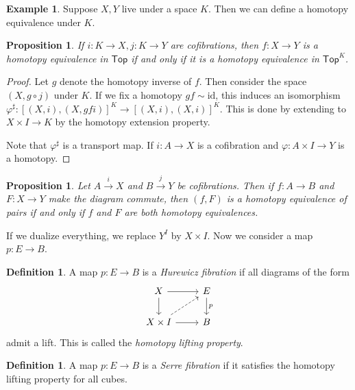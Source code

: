 \documentclass[leqno, openany]{memoir}
\newtheorem{prop}[thm]{Proposition}
\theoremstyle{definition}
\newtheorem{defn}[thm]{Definition}
\newtheorem{exm}[thm]{Example}
\theoremstyle{remark}
\theoremstyle{plain}
\theoremstyle{definition}
\theoremstyle{remark}
\newcommand{\mr}[1]{\mathrm{#1}}
\newcommand{\ms}[1]{\mathsf{#1}}
\begin{document}
\begin{exm}
    Suppose $X,Y$ live under a space $K$. Then we can define a homotopy equivalence under $K$.
\end{exm}

\begin{prop}
    If $i \colon K \to X,j \colon K \to Y$ are cofibrations, then $f \colon X \to Y$ is a homotopy equivalence in $\ms{Top}$ if and only if it is a homotopy equivalence in $\ms{Top}^K$.
\end{prop}

\begin{proof}
    Let $g$ denote the homotopy inverse of $f$. Then consider the space $(X, g \circ j)$ under $K$. If we fix a homotopy $gf \sim \mr{id}$, this induces an isomorphism $\varphi^{\sharp} \colon [(X,i), (X,gfi)]^K \to [(X,i), (X,i)]^K$. This is done by extending to $X \times I \to K$ by the homotopy extension property.

Note that $\varphi^{\sharp}$ is a transport map. If $i \colon A \to X$ is a cofibration and $\varphi \colon A \times I \to Y$ is a homotopy. 
\end{proof}

\begin{prop}
    Let $A \xrightarrow{i} X$ and $B \xrightarrow{j} Y$ be cofibrations. Then if $f \colon A \to B$ and $F \colon X \to Y$ make the diagram commute, then $(f, F)$ is a homotopy equivalence of pairs if and only if $f$ and $F$ are both homotopy equivalences.
\end{prop}

If we dualize everything, we replace $Y^I$ by $X \times I$. Now we consider a map $p \colon E \to B$.

\begin{defn}
    A map $p \colon E \to B$ is a \textit{Hurewicz fibration} if all diagrams of the form
    \begin{equation}
    \begin{tikzcd}
        X \arrow{r} \arrow{d} & E \arrow{d}{p} \\
        X \times I \arrow{r} \arrow[dashrightarrow]{ur} & B
    \end{tikzcd}
    \end{equation}
    admit a lift. This is called the \textit{homotopy lifting property}.  
\end{defn}

\begin{defn}
    A map $p \colon E \to B$ is a \textit{Serre fibration} if it satisfies the homotopy lifting property for all cubes. 
\end{defn}
\end{document}
